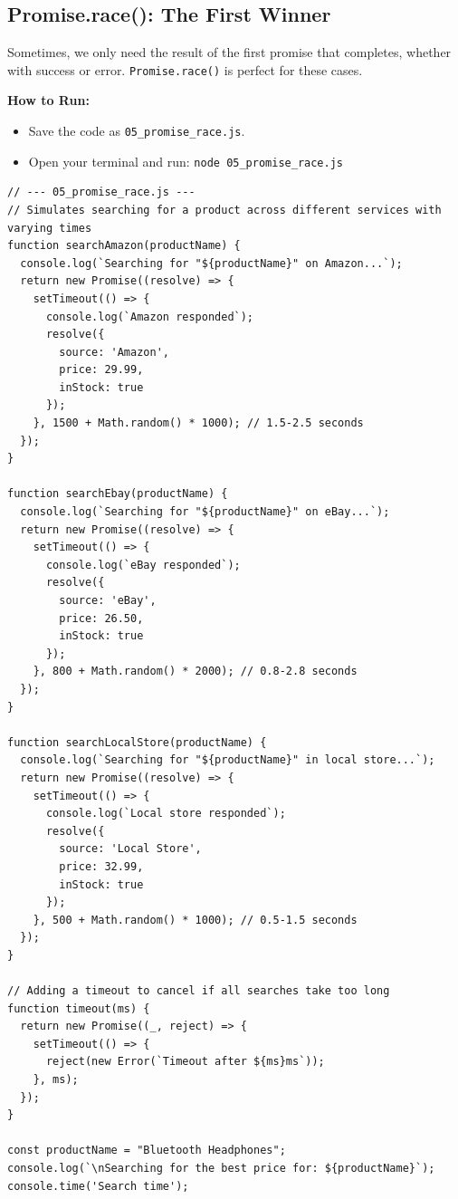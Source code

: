 \documentclass[12pt,letterpaper]{article}
\newenvironment{macterminal}{%
    \begin{mdframed}[
        linecolor=terminalFrame,
        backgroundcolor=terminalBg,
        roundcorner=5pt,
        skipabove=5pt,
        skipbelow=5pt,
        linewidth=1pt,
        innertopmargin=5pt,
        frametitle={%
            \tikz[baseline=(current bounding box.east), outer sep=0pt]{
                \fill[red!80!black] (0,0) circle (5pt);
                \fill[yellow!80!black] (0.7,0) circle (5pt);
                \fill[green!70!black] (1.4,0) circle (5pt);
            }
        },
        frametitlealignment=\raggedright,
        frametitleaboveskip=8pt,
        frametitlebelowskip=0pt,
    ]
}{%
    \end{mdframed}%
}
\begin{document}
\subsection{Promise.race(): The First Winner}

Sometimes, we only need the result of the first promise that completes, whether with success or error. \texttt{\textcolor{accentColor}{Promise.race()}} is perfect for these cases.

\textbf{How to Run:}
\begin{itemize}
    \item Save the code as \verb|05_promise_race.js|.
    \item Open your terminal and run: \verb|node 05_promise_race.js|
\end{itemize}

\begin{macterminal}
\begin{lstlisting}
// --- 05_promise_race.js ---
// Simulates searching for a product across different services with varying times
function searchAmazon(productName) {
  console.log(`Searching for "${productName}" on Amazon...`);
  return new Promise((resolve) => {
    setTimeout(() => {
      console.log(`Amazon responded`);
      resolve({
        source: 'Amazon',
        price: 29.99,
        inStock: true
      });
    }, 1500 + Math.random() * 1000); // 1.5-2.5 seconds
  });
}

function searchEbay(productName) {
  console.log(`Searching for "${productName}" on eBay...`);
  return new Promise((resolve) => {
    setTimeout(() => {
      console.log(`eBay responded`);
      resolve({
        source: 'eBay',
        price: 26.50,
        inStock: true
      });
    }, 800 + Math.random() * 2000); // 0.8-2.8 seconds
  });
}

function searchLocalStore(productName) {
  console.log(`Searching for "${productName}" in local store...`);
  return new Promise((resolve) => {
    setTimeout(() => {
      console.log(`Local store responded`);
      resolve({
        source: 'Local Store',
        price: 32.99,
        inStock: true
      });
    }, 500 + Math.random() * 1000); // 0.5-1.5 seconds
  });
}

// Adding a timeout to cancel if all searches take too long
function timeout(ms) {
  return new Promise((_, reject) => {
    setTimeout(() => {
      reject(new Error(`Timeout after ${ms}ms`));
    }, ms);
  });
}

const productName = "Bluetooth Headphones";
console.log(`\nSearching for the best price for: ${productName}`);
console.time('Search time');


\end{lstlisting}
\end{macterminal}
\end{document}
